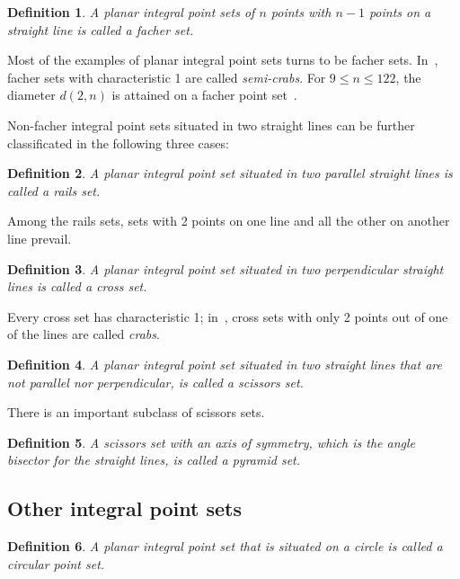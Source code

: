 \documentclass[12pt]{article}
\theoremstyle{theorem}
\theoremstyle{dfn}
\newtheorem{dfn}{Definition}
\theoremstyle{remark}
\begin{document}
\begin{dfn}
	A planar integral point sets of $n$ points with $n-1$ points on a straight line is called
	a \textit{facher} set.
\end{dfn}
Most of the examples of planar integral point sets turns to be facher sets.
In~\cite{antonov2008maximal}, facher sets with characteristic 1 are called \textit{semi-crabs}.
For $9 \leq n \leq 122$, the diameter $d(2,n)$ is attained on a facher point set~\cite{kurz2008minimum}.

Non-facher integral point sets situated in two straight lines
can be further classificated in the following three cases:

\begin{dfn}
	A planar integral point set situated in two parallel straight lines
	is called a \textit{rails} set.
\end{dfn}

Among the rails sets, sets with 2 points on one line and all the other on another line prevail.

\begin{dfn}
	A planar integral point set situated in two perpendicular straight lines
	is called a \textit{cross} set.
\end{dfn}
Every cross set has characteristic 1;
in~\cite{antonov2008maximal}, cross sets with only 2 points out of one of the lines are called \textit{crabs}.

\begin{dfn}
	A planar integral point set situated in two straight lines
	that are not parallel nor perpendicular,
	is called a \textit{scissors} set.
\end{dfn}

There is an important subclass of scissors sets.

\begin{dfn}
	A scissors set with an axis of symmetry,
	which is the angle bisector for the straight lines,
	is called a \textit{pyramid} set.
\end{dfn}



\subsection{Other integral point sets}

\begin{dfn}
	A planar integral point set that is situated on a circle is called a \textit{circular}
	point set.
\end{dfn}
\end{document}
